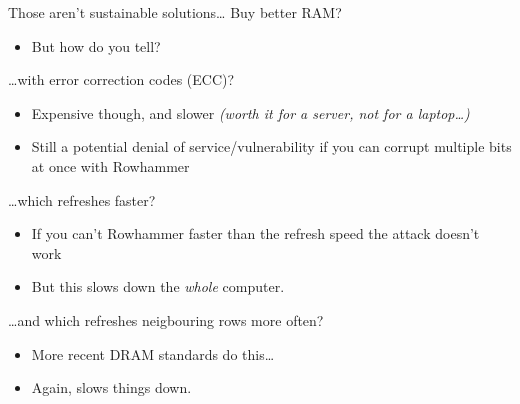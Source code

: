 \documentclass[9pt,aspectratio=169]{beamer}
\begin{document}
\begin{frame}[label={sec:orgaadfbbe}]{Those aren't sustainable solutions\ldots{}}
Buy better RAM?
\begin{itemize}
\item But how do you tell?
\end{itemize}

\ldots{}with error correction codes (ECC)?
\begin{itemize}
\item Expensive though, and slower \emph{(worth it for a server, not for a laptop\ldots{})}
\item Still a potential denial of service/vulnerability if you can corrupt multiple bits at once with Rowhammer
\end{itemize}

\ldots{}which refreshes faster?
\begin{itemize}
\item If you can't Rowhammer faster than the refresh speed the attack doesn't work
\item But this slows down the \emph{whole} computer.
\end{itemize}

\ldots{}and which refreshes neigbouring rows more often?
\begin{itemize}
\item More recent DRAM standards do this\ldots{}
\item Again, slows things down.
\end{itemize}
\end{frame}
\end{document}
